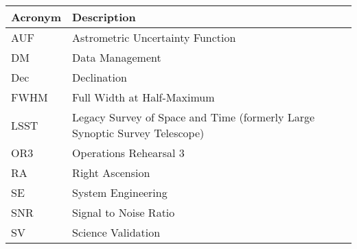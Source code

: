 \addtocounter{table}{-1}
\begin{longtable}{p{}p{}}\hline
\textbf{Acronym} & \textbf{Description}  \\\hline

AUF & Astrometric Uncertainty Function \\\hline
DM & Data Management \\\hline
Dec & Declination \\\hline
FWHM & Full Width at Half-Maximum \\\hline
LSST & Legacy Survey of Space and Time (formerly Large Synoptic Survey Telescope) \\\hline
OR3 & Operations Rehearsal 3 \\\hline
RA & Right Ascension \\\hline
SE & System Engineering \\\hline
SNR & Signal to Noise Ratio \\\hline
SV & Science Validation \\\hline
\end{longtable}
